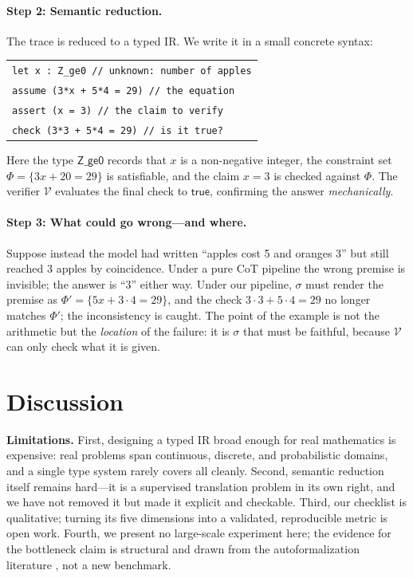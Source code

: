 \documentclass[11pt]{article}
\newcommand{\VV}{\mathcal{V}}
\begin{document}
\paragraph{Step 2: Semantic reduction.}
The trace is reduced to a typed IR. We write it in a small concrete syntax:

\begin{center}
\small
\begin{tabular}{@{}l@{}}
\texttt{let x : Z\_ge0  \qquad // unknown: number of apples} \\
\texttt{assume (3*x + 5*4 = 29) \quad // the equation} \\
\texttt{assert (x = 3) \qquad\qquad\quad // the claim to verify} \\
\texttt{check (3*3 + 5*4 = 29) \quad // is it true?} \\
\end{tabular}
\end{center}

Here the type $\mathsf{Z\_ge0}$ records that $x$ is a non-negative integer, the constraint set $\Phi = \{3x + 20 = 29\}$ is satisfiable, and the claim $x = 3$ is checked against $\Phi$. The verifier $\VV$ evaluates the final check to $\mathsf{true}$, confirming the answer \emph{mechanically}.

\paragraph{Step 3: What could go wrong---and where.}
Suppose instead the model had written ``apples cost 5 and oranges 3'' but still reached 3 apples by coincidence. Under a pure CoT pipeline the wrong premise is invisible; the answer is ``3'' either way. Under our pipeline, $\sigma$ must render the premise as $\Phi' = \{5x + 3\cdot 4 = 29\}$, and the check $3\cdot 3 + 5\cdot 4 = 29$ no longer matches $\Phi'$; the inconsistency is caught. The point of the example is not the arithmetic but the \emph{location} of the failure: it is $\sigma$ that must be faithful, because $\VV$ can only check what it is given.

\section{Discussion}
\label{sec:discussion}
\textbf{Limitations.} First, designing a typed IR broad enough for real mathematics is expensive: real problems span continuous, discrete, and probabilistic domains, and a single type system rarely covers all cleanly. Second, semantic reduction itself remains hard---it is a supervised translation problem in its own right, and we have not removed it but made it explicit and checkable. Third, our checklist is qualitative; turning its five dimensions into a validated, reproducible metric is open work. Fourth, we present no large-scale experiment here; the evidence for the bottleneck claim is structural and drawn from the autoformalization literature \cite{wu2022autoformal}, not a new benchmark.
\end{document}
